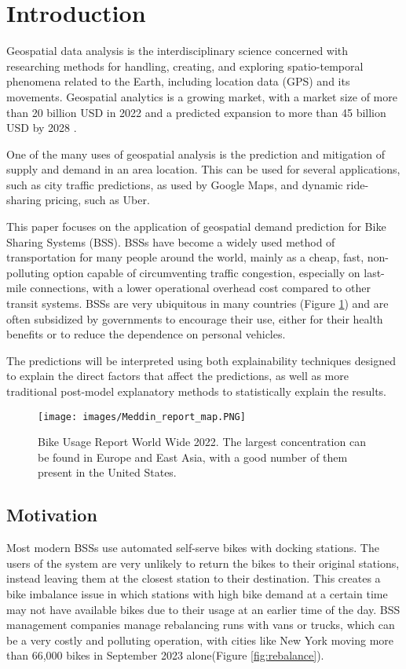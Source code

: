 \documentclass{article}
\begin{document}
\tableofcontents
\pagebreak
\section{Introduction}
Geospatial data analysis is the interdisciplinary science concerned with researching methods for handling, creating, and exploring spatio-temporal phenomena related to the Earth\cite{Bill2022}, including location data (GPS) and its movements. Geospatial analytics is a growing market, with a market size of more than 20 billion USD in 2022 and a predicted expansion to more than 45 billion USD by 2028 \cite{trends2023}. 

One of the many uses of geospatial analysis is the prediction and mitigation of supply and demand in an area location. This can be used for several applications, such as city traffic predictions, as used by Google Maps, and dynamic ride-sharing pricing, such as Uber\cite{Sinha2020}.

This paper focuses on the application of geospatial demand prediction for Bike Sharing Systems (BSS). BSSs have become a widely used method of transportation for many people around the world, mainly as a cheap, fast, non-polluting option capable of circumventing traffic congestion, especially on last-mile connections, with a lower operational overhead cost compared to other transit systems\cite{Shaheen2010}. BSSs are very ubiquitous in many countries\cite{Meddin2022} (Figure \ref{fig:meddin}) and are often subsidized by governments to encourage their use, either for their health benefits or to reduce the dependence on personal vehicles\cite{Shaheen2010}\cite{Nikiforiadis2019}.

The predictions will be interpreted using both explainability techniques designed to explain the direct factors that affect the predictions\cite{Holzinger2022}, as well as more traditional post-model explanatory methods to statistically explain the results.

\begin{figure}
\centering
\texttt{[image: images/Meddin\_report\_map.PNG]}
\caption{Bike Usage Report World Wide 2022. The largest concentration can be found in Europe and East Asia, with a good number of them present in the United States.}
\label{fig:meddin}
\end{figure}

\subsection{Motivation}
Most modern BSSs use automated self-serve bikes with docking stations. The users of the system are very unlikely to return the bikes to their original stations, instead leaving them at the closest station to their destination\cite{Shaheen2010}. This creates a bike imbalance issue in which stations with high bike demand at a certain time may not have available bikes due to their usage at an earlier time of the day\cite{Cho2021}. BSS management companies manage rebalancing runs with vans or trucks, which can be a very costly and polluting operation, with cities like New York moving more than 66,000 bikes in September 2023 alone\cite{Lyft2024}(Figure \ref{fig:rebalance}).
\end{document}

